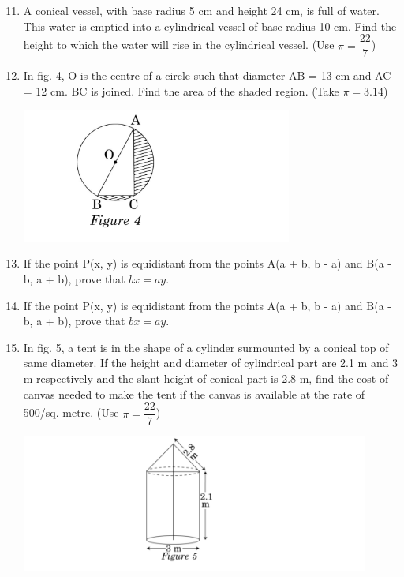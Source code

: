 \documentclass[a4paper,12pt]{article}
\begin{document}
\begin{enumerate}
    \setcounter{enumi}{10}

    \item A conical vessel, with base radius 5 cm and height 24 cm, is full of water. This water is emptied into a cylindrical vessel of base radius 10 cm. Find the height to which the water will rise in the cylindrical vessel. (Use $\pi = \dfrac{22}{7}$)

    \item In fig. 4, O is the centre of a circle such that diameter AB = 13 cm and AC = 12 cm. BC is joined. Find the area of the shaded region. (Take $\pi = 3.14$)

    \begin{center}
        \includegraphics[width=0.7\textwidth]{p1.png
} %
        \\
    \end{center}

    \item If the point P(x, y) is equidistant from the points A(a + b, b - a) and B(a - b, a + b), prove that $bx = ay$.
\item If the point P(x, y) is equidistant from the points A(a + b, b - a) and B(a - b, a + b), prove that $bx = ay$.

    \item In fig. 5, a tent is in the shape of a cylinder surmounted by a conical top of same diameter. If the height and diameter of cylindrical part are 2.1 m and 3 m respectively and the slant height of conical part is 2.8 m, find the cost of canvas needed to make the tent if the canvas is available at the rate of 500/sq. metre. (Use $\pi = \dfrac{22}{7}$)

    \begin{center}
        \includegraphics[width=0.9\textwidth]{l1.png} %
        \\
    \end{center}
\setcounter{enumi}{14}


\end{enumerate}
\end{document}
